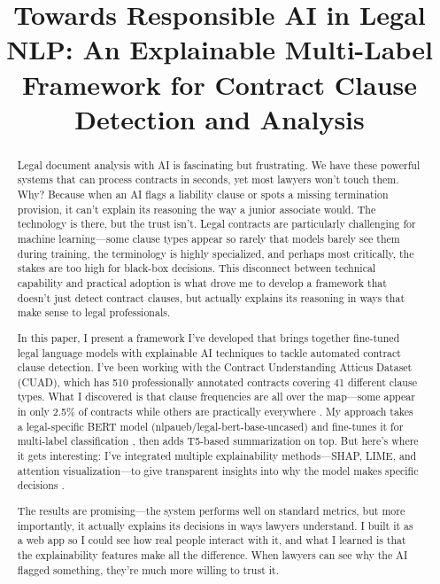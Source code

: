 \documentclass[conference]{IEEEtran}
\begin{document}
\title{Towards Responsible AI in Legal NLP: An Explainable Multi-Label Framework for Contract Clause Detection and Analysis}

\author{
}

\maketitle

\thispagestyle{plain}
\pagestyle{plain}

\begin{abstract}
Legal document analysis with AI is fascinating but frustrating. We have these powerful systems that can process contracts in seconds, yet most lawyers won't touch them. Why? Because when an AI flags a liability clause or spots a missing termination provision, it can't explain its reasoning the way a junior associate would. The technology is there, but the trust isn't. Legal contracts are particularly challenging for machine learning—some clause types appear so rarely that models barely see them during training, the terminology is highly specialized, and perhaps most critically, the stakes are too high for black-box decisions. This disconnect between technical capability and practical adoption is what drove me to develop a framework that doesn't just detect contract clauses, but actually explains its reasoning in ways that make sense to legal professionals.

In this paper, I present a framework I've developed that brings together fine-tuned legal language models with explainable AI techniques to tackle automated contract clause detection. I've been working with the Contract Understanding Atticus Dataset (CUAD), which has 510 professionally annotated contracts covering 41 different clause types. What I discovered is that clause frequencies are all over the map—some appear in only 2.5\% of contracts while others are practically everywhere \cite{hendrycks2021cuad}. My approach takes a legal-specific BERT model (nlpaueb/legal-bert-base-uncased) and fine-tunes it for multi-label classification \cite{chalkidis2020legal}, then adds T5-based summarization on top. But here's where it gets interesting: I've integrated multiple explainability methods—SHAP, LIME, and attention visualization—to give transparent insights into why the model makes specific decisions \cite{lundberg2017unified}.

The results are promising—the system performs well on standard metrics, but more importantly, it actually explains its decisions in ways lawyers understand. I built it as a web app so I could see how real people interact with it, and what I learned is that the explainability features make all the difference. When lawyers can see why the AI flagged something, they're much more willing to trust it.
\end{abstract}
\end{document}
